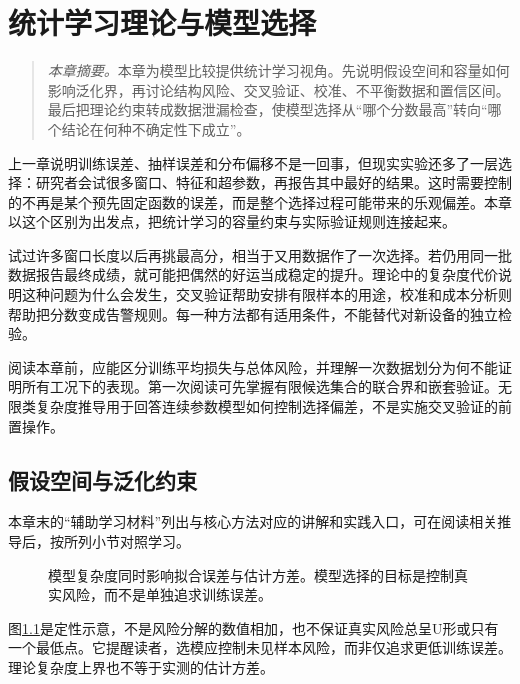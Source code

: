 \chapter{统计学习理论与模型选择}

\begin{quote}\small
\textit{本章摘要。}本章为模型比较提供统计学习视角。先说明假设空间和容量如何影响泛化界，再讨论结构风险、交叉验证、校准、不平衡数据和置信区间。最后把理论约束转成数据泄漏检查，使模型选择从“哪个分数最高”转向“哪个结论在何种不确定性下成立”。
\end{quote}

上一章说明训练误差、抽样误差和分布偏移不是一回事，但现实实验还多了一层选择：研究者会试很多窗口、特征和超参数，再报告其中最好的结果。这时需要控制的不再是某个预先固定函数的误差，而是整个选择过程可能带来的乐观偏差。本章以这个区别为出发点，把统计学习的容量约束与实际验证规则连接起来。

试过许多窗口长度以后再挑最高分，相当于又用数据作了一次选择。若仍用同一批数据报告最终成绩，就可能把偶然的好运当成稳定的提升。理论中的复杂度代价说明这种问题为什么会发生，交叉验证帮助安排有限样本的用途，校准和成本分析则帮助把分数变成告警规则。每一种方法都有适用条件，不能替代对新设备的独立检验。

阅读本章前，应能区分训练平均损失与总体风险，并理解一次数据划分为何不能证明所有工况下的表现。第一次阅读可先掌握有限候选集合的联合界和嵌套验证。无限类复杂度推导用于回答连续参数模型如何控制选择偏差，不是实施交叉验证的前置操作。

\section{假设空间与泛化约束}

本章末的“辅助学习材料”列出与核心方法对应的讲解和实践入口，可在阅读相关推导后，按所列小节对照学习。

\begin{figure}[htbp]
\centering
{}
\caption{模型复杂度同时影响拟合误差与估计方差。模型选择的目标是控制真实风险，而不是单独追求训练误差。}
\label{fig:statistical-complexity-tradeoff}
\end{figure}
图\ref{fig:statistical-complexity-tradeoff}是定性示意，不是风险分解的数值相加，也不保证真实风险总呈U形或只有一个最低点。它提醒读者，选模应控制未见样本风险，而非仅追求更低训练误差。理论复杂度上界也不等于实测的估计方差。

